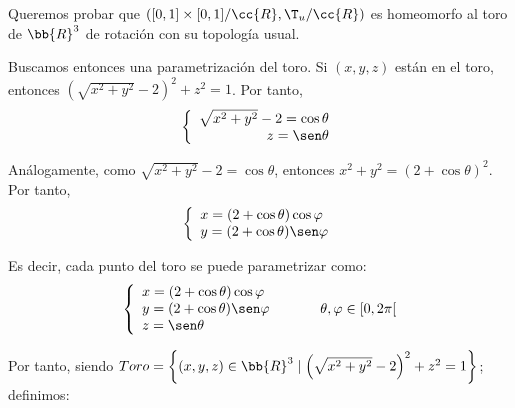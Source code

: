 \begin{ejemplo}
\begin{enumerate}
        Queremos probar que $\left([0,1]\times [0,1]/\cc{R}, \T_u/\cc{R}\right)$ es homeomorfo al toro de $\bb{R}^3$ de rotación con su topología usual.

        Buscamos entonces una parametrización del toro. Si $(x,y,z)$ están en el toro, entonces $\left(\sqrt{x^2+y^2}-2\right)^2 + z^2= 1$. Por tanto,
        \begin{equation*}
            \left\{\begin{array}{r}
                \sqrt{x^2+y^2}-2 = \cos\theta \\
                z = \sen\theta
            \end{array}\right.
        \end{equation*}

        Análogamente, como $\sqrt{x^2+y^2}-2 = \cos\theta$, entonces $x^2+y^2 = (2+\cos\theta)^2$. Por tanto,
        \begin{equation*}
            \left\{\begin{array}{l}
                x = (2+\cos\theta)\cos\varphi\\
                y = (2+\cos\theta)\sen\varphi\\
            \end{array}\right.
        \end{equation*}

        Es decir, cada punto del toro se puede parametrizar como:
        \begin{equation*}
            \left\{\begin{array}{l}
                x = (2+\cos\theta)\cos\varphi\\
                y = (2+\cos\theta)\sen\varphi\\
                z = \sen\theta
            \end{array}\right. \hspace{1cm} \theta,\varphi\in [0,2\pi[
        \end{equation*}

        Por tanto, siendo $Toro=\left\{(x,y,z)\in \bb{R}^3\mid \left(\sqrt{x^2+y^2}-2\right)^2 + z^2=1\right\}$; definimos:


\end{enumerate}
\end{ejemplo}
